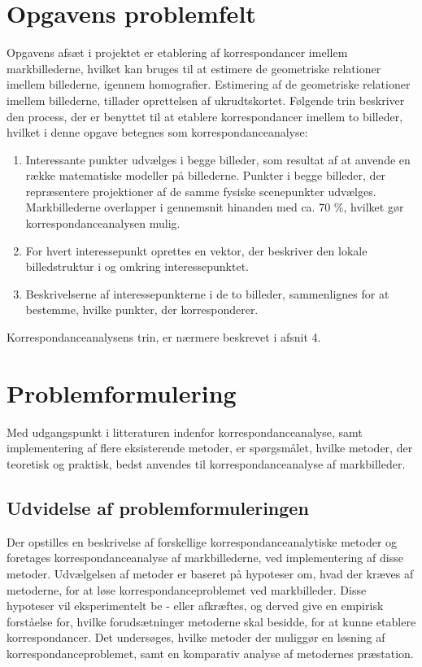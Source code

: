 \section{Opgavens problemfelt} \label{subsec:felt}
Opgavens afsæt i projektet er etablering af korrespondancer imellem markbillederne, hvilket kan bruges til at estimere de geometriske relationer imellem billederne, igennem homografier. Estimering af de geometriske relationer imellem billederne, tillader oprettelsen af ukrudtskortet. Følgende trin beskriver den process, der er benyttet til at etablere korrespondancer imellem to billeder, hvilket i denne opgave betegnes som korrespondanceanalyse:
\begin{enumerate}
\item{Interessante punkter udvælges i begge billeder, som resultat af at anvende en række matematiske modeller på billederne. Punkter i begge billeder, der repræsentere projektioner af de samme fysiske scenepunkter udvælges. Markbillederne overlapper i gennemsnit hinanden med ca. 70 \%, hvilket gør korrespondanceanalysen mulig.}
\item{For hvert interessepunkt oprettes en vektor, der beskriver den lokale billedstruktur i og omkring interessepunktet.}
\item{Beskrivelserne af interessepunkterne i de to billeder, sammenlignes for at bestemme, hvilke punkter, der korresponderer.}
\end{enumerate}
Korrespondanceanalysens trin, er nærmere beskrevet i afsnit 4.
\section{Problemformulering} \label{subsec:form}
Med udgangspunkt i litteraturen indenfor
korrespondanceanalyse, samt implementering af
flere eksisterende metoder, er spørgsmålet, hvilke metoder, der teoretisk og praktisk, bedst anvendes til korrespondanceanalyse af markbilleder.
\subsection{Udvidelse af problemformuleringen}
Der opstilles en beskrivelse af forskellige korrespondanceanalytiske metoder og foretages korrespondanceanalyse af markbillederne, ved implementering af disse metoder. Udvælgelsen af metoder er baseret på hypoteser om, hvad der kræves af metoderne, for at løse korrespondanceproblemet ved markbilleder. Disse hypoteser vil eksperimentelt be - eller afkræftes, og derved give en empirisk forståelse for, hvilke forudsætninger metoderne skal besidde, for at kunne etablere korrespondancer. 
Det undersøges, hvilke metoder der muliggør en løsning af korrespondanceproblemet, samt en komparativ analyse af metodernes præstation.
